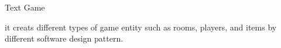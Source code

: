 Text Game

it creats different types of game entity such as rooms, players, and items by different software design pattern. 
